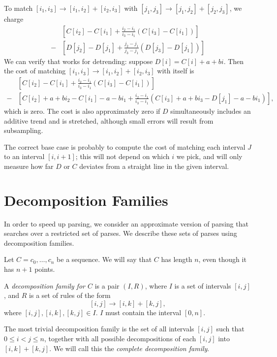To match $[i_1,i_3]\to [i_1,i_2] + [i_2, i_3]$ with $[j_1,j_3]\to [j_1,j_2] + [j_2, j_3]$, we charge
\begin{align*}
&\left[ C[i_2] - C[i_1] + \frac{i_2 - i_1}{i_3 - i_1}(C[i_3] - C[i_1])\right] \\
-&\left[ D[j_2] - D[j_1] + \frac{j_2 - j_1}{j_3 - j_1}(D[j_3] - D[j_1])\right] 
\end{align*}
We can verify that works for detrending: suppose $D[i] = C[i] + a + bi$. Then the cost of matching 
$[i_1,i_3]\to [i_1,i_2] + [i_2, i_3]$ with itself is
\begin{align*}
&\left[ C[i_2] - C[i_1] + \frac{i_2 - i_1}{i_3 - i_1}(C[i_3] - C[i_1])\right] \\
-&\left[ C[i_2] + a + bi_2 - C[i_1] -a - bi_1 + \frac{i_2 - i_1}{i_3 - i_1}(C[i_3] + a + bi_3 - D[j_1] - a - bi_1)\right],
\end{align*}
which is zero. The cost is also approximately zero if $D$
simultaneously includes an additive trend and is stretched, although
small errors will result from subsampling. 

The correct base case is probably to compute the cost of matching each
interval $J$ to an interval $[i,i+1]$; this will not depend on which
$i$ we pick, and will only measure how far $D$ or $C$ deviates from a
straight line in the given interval.


\section{Decomposition Families}

In order to speed up parsing, we consider an approximate version of
parsing that searches over a restricted set of parses. We describe
these sets of parses using decomposition families.

\begin{defn}
Let $C=c_0,\dots,c_n$ be a sequence. We will say that $C$ has length
$n$, even though it has $n+1$ points.

A {\em decomposition family for $C$} is a pair $(I, R)$, where $I$ is
a set of intervals $[i,j]$, and $R$ is a set of rules of the form
$$[i,j] \to [i,k] + [k,j],$$ where $[i,j], [i,k], [k,j]\in I$. $I$
  must contain the interval $[0,n]$.
\end{defn}

The most trivial decomposition family is the set of all intervals
$[i,j]$ such that $0\le i < j \le n$, together with all possible
decompositions of each $[i,j]$ into $[i,k] + [k,j]$. We will call this
the {\em complete decomposition family}.

